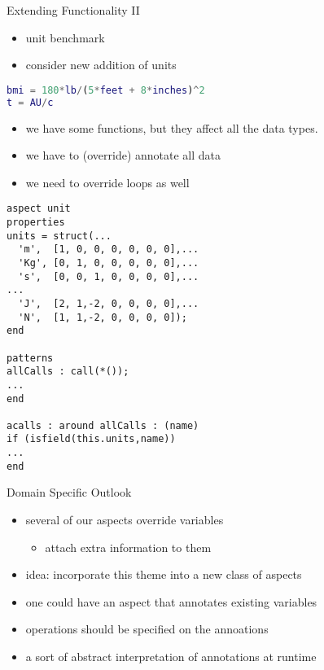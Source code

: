 \begin{frame}[fragile]{Extending Functionality II}
\begin{itemize}
\item unit benchmark
\item consider new addition of units
\end{itemize}
\begin{lstlisting}[language=Matlab]
bmi = 180*lb/(5*feet + 8*inches)^2
t = AU/c
\end{lstlisting}
\begin{itemize}
 \item we have some functions, but they affect all the data types.
 \item we have to (override) annotate all data
 \item we need to override loops as well
\end{itemize}
\begin{lstlisting}
aspect unit
properties
units = struct(...
  'm',  [1, 0, 0, 0, 0, 0, 0],...
  'Kg', [0, 1, 0, 0, 0, 0, 0],...
  's',  [0, 0, 1, 0, 0, 0, 0],...
...
  'J',  [2, 1,-2, 0, 0, 0, 0],...
  'N',  [1, 1,-2, 0, 0, 0, 0]);
end

patterns
allCalls : call(*());
...
end

acalls : around allCalls : (name)
if (isfield(this.units,name))
...
end
\end{lstlisting}

\end{frame}

\begin{frame}{Domain Specific Outlook}
\begin{itemize}
  \item several of our aspects override variables
    \begin{itemize}
    \item attach extra information to them
    \end{itemize}
  \item idea: incorporate this theme into a new class of aspects
  \item one could have an aspect that annotates existing variables
  \item operations should be specified on the annoations
  \item a sort of abstract interpretation of annotations at runtime
\end{itemize}
\end{frame}

